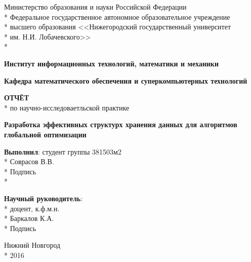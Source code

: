 \begin{titlepage}

\begin{center}
Министерство образования и науки Российской Федерации \\*
Федеральное   государственное  автономное  образовательное  учреждение \\*
высшего образования <<Нижегородский государственный университет \\*
им. Н.И. Лобачевского>> \\*
\end{center}

\vspace{12pt}

\begin{center}
\textbf{Институт информационных технологий, математики и механики}
\end{center}

\begin{center}
\textbf{Кафедра математического обеспечения и суперкомпьютерных технологий}
\end{center}

\vspace{105pt}

\begin{center}
\fontsize{18pt}{0pt}\textbf{ОТЧЁТ} \\*
по научно-исследоваетльской практике
\end{center}

\begin{center}
\fontsize{16pt}{0pt}\textbf{Разработка эффективных структурх хранения данных для алгоритмов глобальной оптимизации}
\end{center}

\vspace{53pt}

\begin{flushright}
\textbf{Выполнил}: студент группы 381503м2 \\*
 Соврасов В.В. \\*
Подпись  \\*

\textbf{Научный руководитель}:  \\*
доцент, к.ф.м.н.  \\*
 Баркалов К.А. \\*
Подпись 
\end{flushright}

\vspace{\fill}

\begin{center}
Нижний Новгород \\*
2016
\end{center}

\end{titlepage}
